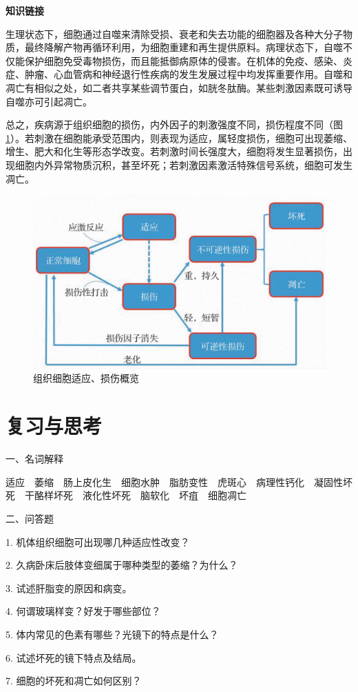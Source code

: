 \begin{center}
	\textbf{知识链接}
\end{center}

生理状态下，细胞通过自噬来清除受损、衰老和失去功能的细胞器及各种大分子物质，最终降解产物再循环利用，为细胞重建和再生提供原料。病理状态下，自噬不仅能保护细胞免受毒物损伤，而且能抵御病原体的侵害。在机体的免疫、感染、炎症、肿瘤、心血管病和神经退行性疾病的发生发展过程中均发挥重要作用。自噬和凋亡有相似之处，如二者共享某些调节蛋白，如胱冬肽酶。某些刺激因素既可诱导自噬亦可引起凋亡。

总之，疾病源于组织细胞的损伤，内外因子的刺激强度不同，损伤程度不同（图\ref{fig1-20}）。若刺激在细胞能承受范围内，则表现为适应，属轻度损伤，细胞可出现萎缩、增生、肥大和化生等形态学改变。若刺激时间长强度大，细胞将发生显著损伤，出现细胞内外异常物质沉积，甚至坏死；若刺激因素激活特殊信号系统，细胞可发生凋亡。

\begin{figure}[!htbp]
	\centering
	\includegraphics{./images/Image00023.jpg}
	\caption{组织细胞适应、损伤概览}
	\label{fig1-20}
\end{figure}

\section*{复习与思考}

{一、名词解释}

适应　萎缩　肠上皮化生　细胞水肿　脂肪变性　虎斑心　病理性钙化　凝固性坏死　干酪样坏死　液化性坏死　脑软化　坏疽　细胞凋亡

{二、问答题}

1. 机体组织细胞可出现哪几种适应性改变？

2. 久病卧床后肢体变细属于哪种类型的萎缩？为什么？

3. 试述肝脂变的原因和病变。

4. 何谓玻璃样变？好发于哪些部位？

5. 体内常见的色素有哪些？光镜下的特点是什么？

6. 试述坏死的镜下特点及结局。

7. 细胞的坏死和凋亡如何区别？

